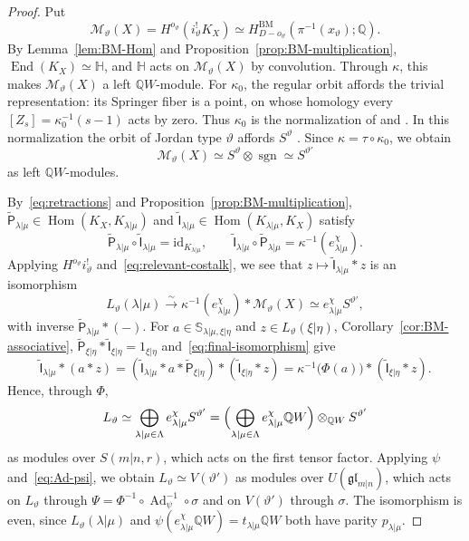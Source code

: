 \documentclass[11pt,a4paper]{amsart}
\theoremstyle{definition}
\theoremstyle{remark}
\newcommand{\Q}{\mathbb Q}
\newcommand{\bS}{\mathbb S}
\newcommand{\bH}{\mathbb H}
\newcommand{\BM}{\mathrm{BM}}
\newcommand{\End}{\operatorname{End}}
\newcommand{\Hom}{\operatorname{Hom}}
\newcommand{\sgn}{\operatorname{sgn}}
\newcommand{\Ad}{\operatorname{Ad}}
\newcommand{\lm}{\lambda|\mu}
\newcommand{\xh}{\xi|\eta}
\numberwithin{equation}{section}
\begin{document}
\begin{proof}
Put
$$
\mathcal M_\vartheta(X)=H^{o_\vartheta}(i_\vartheta^!K_X)
\simeq H^{\BM}_{D-o_\vartheta}(\pi^{-1}(x_\vartheta);\Q).
$$
By Lemma~\ref{lem:BM-Hom} and Proposition~\ref{prop:BM-multiplication},
$\End(K_X)\simeq \bH$, and $\bH$ acts on $\mathcal M_\vartheta(X)$ by
convolution. Through $\kappa$, this makes $\mathcal M_\vartheta(X)$ a left
$\Q W$-module. For
$\kappa_0$, the regular orbit affords the trivial representation:
its Springer fiber is a point, on whose homology every
$[Z_s]=\kappa_0^{-1}(s-1)$ acts by zero. Thus $\kappa_0$ is the normalization of \cite[Sections~2.2--2.3]{BM}
and \cite[Section~1.5.3]{YunLec}. In this normalization the orbit of
Jordan type $\vartheta$ affords $S^\vartheta$
\cite[Section~1.5.16]{YunLec}. Since
$\kappa=\tau\circ\kappa_0$, we obtain
$$
\mathcal M_\vartheta(X)\simeq S^\vartheta\otimes\sgn\simeq S^{\vartheta'}
$$
as left $\Q W$-modules.

By~\eqref{eq:retractions} and Proposition~\ref{prop:BM-multiplication},
$\widetilde{\mathsf P}_{\lm}\in\Hom(K_X,K_{\lm})$ and
$\widetilde{\mathsf I}_{\lm}\in\Hom(K_{\lm},K_X)$ satisfy
$$
\widetilde{\mathsf P}_{\lm}\circ\widetilde{\mathsf I}_{\lm}
=\mathrm{id}_{K_{\lm}},\qquad
\widetilde{\mathsf I}_{\lm}\circ\widetilde{\mathsf P}_{\lm}
=\kappa^{-1}(e_{\lm}^\chi).
$$
Applying $H^{o_\vartheta}i_\vartheta^!$ and~\eqref{eq:relevant-costalk},
we see that $z\mapsto\widetilde{\mathsf I}_{\lm}*z$ is an isomorphism
$$
L_\vartheta(\lm)\xrightarrow{\ \sim\ }
\kappa^{-1}(e_{\lm}^\chi)*\mathcal M_\vartheta(X)
\simeq e_{\lm}^\chi S^{\vartheta'},
$$
with inverse $\widetilde{\mathsf P}_{\lm}*(-)$. For $a\in\bS_{\lm,\xh}$
and $z\in L_\vartheta(\xh)$, Corollary~\ref{cor:BM-associative},
$\widetilde{\mathsf P}_{\xh}*\widetilde{\mathsf I}_{\xh}=1_{\xh}$
and~\eqref{eq:final-isomorphism} give
$$
\widetilde{\mathsf I}_{\lm}*(a*z)
=(\widetilde{\mathsf I}_{\lm}*a*\widetilde{\mathsf P}_{\xh})
 *(\widetilde{\mathsf I}_{\xh}*z)
=\kappa^{-1}\bigl(\Phi(a)\bigr)*(\widetilde{\mathsf I}_{\xh}*z).
$$
Hence, through $\Phi$,
$$
L_\vartheta\simeq
\bigoplus_{\lm\in\Lambda}e_{\lm}^\chi S^{\vartheta'}
=\Bigl(\bigoplus_{\lm\in\Lambda}e_{\lm}^\chi\Q W\Bigr)
 \otimes_{\Q W}S^{\vartheta'}
$$
as modules over $S(m|n,r)$, which acts on the first tensor factor.
Applying $\psi$ and~\eqref{eq:Ad-psi}, we obtain
$L_\vartheta\simeq V(\vartheta')$ as modules over
$U(\mathfrak{gl}_{m|n})$, which acts on $L_\vartheta$ through
$\Psi=\Phi^{-1}\circ\Ad_\psi^{-1}\circ\sigma$ and on $V(\vartheta')$
through $\sigma$. The isomorphism is even, since $L_\vartheta(\lm)$ and
$\psi(e_{\lm}^\chi\Q W)=t_{\lm}\Q W$ both have parity $p_{\lm}$.
\end{proof}
\end{document}
